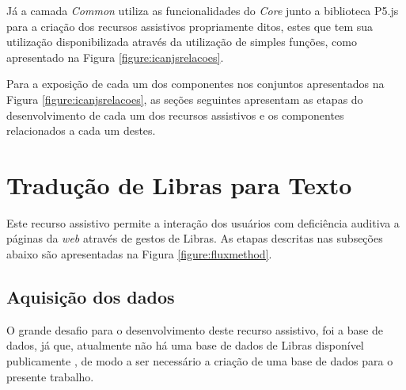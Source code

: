 
Já a camada \textit{Common} utiliza as funcionalidades do \textit{Core} junto a biblioteca P5.js para a criação dos recursos assistivos propriamente ditos, estes que tem sua utilização disponibilizada através da utilização de simples funções, como apresentado na Figura \ref{figure:icanjsrelacoes}.


\par Para a exposição de cada um dos componentes nos conjuntos apresentados na Figura \ref{figure:icanjsrelacoes}, as seções seguintes apresentam as etapas do desenvolvimento de cada um dos recursos assistivos e os componentes relacionados a cada um destes.



\section{Tradução de Libras para Texto}

\par Este recurso assistivo permite a interação dos usuários com deficiência auditiva a páginas da \textit{web} através de gestos de Libras. As etapas descritas nas subseções abaixo são apresentadas na Figura \ref{figure:fluxmethod}.

\subsection{Aquisição dos dados}

\par O grande desafio para o desenvolvimento deste recurso assistivo, foi a base de dados, já que, atualmente não há uma base de dados de Libras disponível publicamente \cite{Magalh2018}, de modo a ser necessário a criação de uma base de dados para o presente trabalho.

